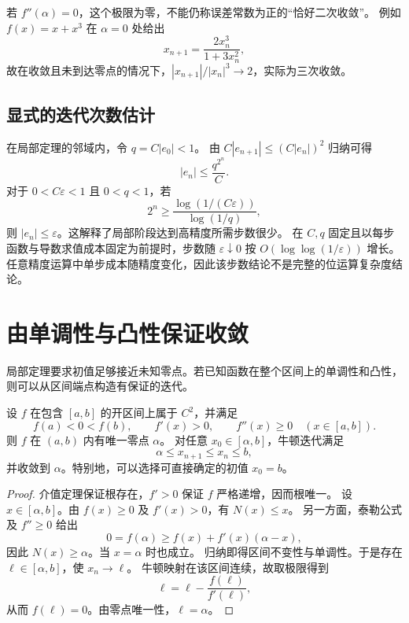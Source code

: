 \documentclass[UTF8,12pt,a4paper,fontset=fandol]{ctexart}
\begin{document}
若 $f''(\alpha)=0$，这个极限为零，不能仍称误差常数为正的“恰好二次收敛”。
例如 $f(x)=x+x^3$ 在 $\alpha=0$ 处给出
\[
  x_{n+1}=\frac{2x_n^3}{1+3x_n^2},
\]
故在收敛且未到达零点的情况下，$|x_{n+1}|/|x_n|^3\to2$，实际为三次收敛。

\subsection{显式的迭代次数估计}

在局部定理的邻域内，令 $q=C|e_0|<1$。
由 $C|e_{n+1}|\le(C|e_n|)^2$ 归纳可得
\begin{equation}\label{eq:newton-double-exponential}
  |e_n|\le\frac{q^{2^n}}{C}.
\end{equation}
对于 $0<C\varepsilon<1$ 且 $0<q<1$，若
\[
  2^n\ge\frac{\log(1/(C\varepsilon))}{\log(1/q)},
\]
则 $|e_n|\le\varepsilon$。这解释了局部阶段达到高精度所需步数很少。
在 $C,q$ 固定且以每步函数与导数求值成本固定为前提时，步数随
$\varepsilon\downarrow0$ 按 $O(\log\log(1/\varepsilon))$ 增长。
任意精度运算中单步成本随精度变化，因此该步数结论不是完整的位运算复杂度结论。

\section{由单调性与凸性保证收敛}
\label{sec:newton-monotone}

局部定理要求初值足够接近未知零点。若已知函数在整个区间上的单调性和凸性，
则可以从区间端点构造有保证的迭代。

\begin{theorem}[递增凸函数的单调牛顿迭代]\label{thm:newton-monotone}
设 $f$ 在包含 $[a,b]$ 的开区间上属于 $C^2$，并满足
\[
  f(a)<0<f(b),\qquad f'(x)>0,\qquad f''(x)\ge0
  \quad(x\in[a,b]).
\]
则 $f$ 在 $(a,b)$ 内有唯一零点 $\alpha$。
对任意 $x_0\in[\alpha,b]$，牛顿迭代满足
\[
  \alpha\le x_{n+1}\le x_n\le b,
\]
并收敛到 $\alpha$。特别地，可以选择可直接确定的初值 $x_0=b$。
\end{theorem}

\begin{proof}
介值定理保证根存在，$f'>0$ 保证 $f$ 严格递增，因而根唯一。
设 $x\in[\alpha,b]$。由 $f(x)\ge0$ 及 $f'(x)>0$，有 $N(x)\le x$。
另一方面，泰勒公式及 $f''\ge0$ 给出
\[
  0=f(\alpha)\ge f(x)+f'(x)(\alpha-x),
\]
因此 $N(x)\ge\alpha$。当 $x=\alpha$ 时也成立。
归纳即得区间不变性与单调性。于是存在 $\ell\in[\alpha,b]$，使 $x_n\to\ell$。
牛顿映射在该区间连续，故取极限得到
\[
  \ell=\ell-\frac{f(\ell)}{f'(\ell)},
\]
从而 $f(\ell)=0$。由零点唯一性，$\ell=\alpha$。
\end{proof}
\end{document}
